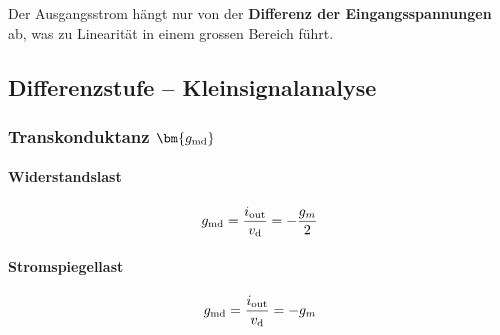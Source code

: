 \smallskip

Der Ausgangsstrom hängt nur von der \textbf{Differenz der Eingangsspannungen} ab, was zu Linearität in einem grossen Bereich führt.


\subsection{Differenzstufe -- Kleinsignalanalyse}

\subsubsection{Transkonduktanz $\bm{g_{\rm md}}$}

\begin{minipage}[t]{0.48\columnwidth}
    \paragraph{Widerstandslast}

    \[
        g_{\rm md} = \frac{i_{\rm out}}{v_{\rm d}} = - \frac{g_m}{2}
    \]
\end{minipage}
\hfill
\begin{minipage}[t]{0.48\columnwidth}
    \paragraph{Stromspiegellast}

    \[
        g_{\rm md} = \frac{i_{\rm out}}{v_{\rm d}} = - g_m
    \]
\end{minipage}






